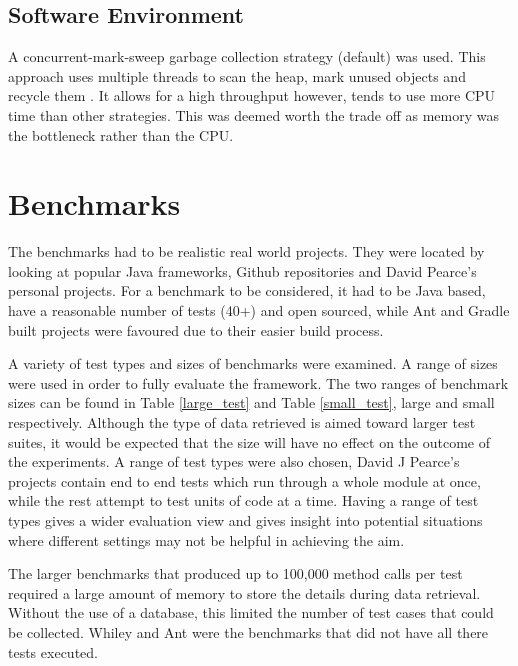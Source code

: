 \subsection{Software Environment}

A concurrent-mark-sweep garbage collection strategy (default) was used. This approach uses multiple threads to scan the heap, mark unused objects and recycle them \cite{oracle2015}. It allows for a high throughput however, tends to use more CPU time than other strategies. This was deemed worth the trade off as memory was the bottleneck rather than the CPU.

\section{Benchmarks}
\label{S:bench}
The benchmarks had to be realistic real world projects. They were located by looking at popular Java frameworks, Github repositories and David Pearce's personal projects. For a benchmark to be considered, it had to be Java based, have a reasonable number of tests (40+) and open sourced, while Ant and Gradle built projects were favoured due to their easier build process.

A variety of test types and sizes of benchmarks were examined. A range of sizes were used in order to fully evaluate the framework. The two ranges of benchmark sizes can be found in Table \ref{large_test} and Table \ref{small_test}, large and small respectively. Although the type of data retrieved is aimed toward larger test suites, it would be expected that the size will have no effect on the outcome of the experiments. A range of test types were also chosen, David J Pearce's projects contain end to end tests which run through a whole module at once, while the rest attempt to test units of code at a time. Having a range of test types gives a wider evaluation view and gives insight into potential situations where different settings may not be helpful in achieving the aim.

The larger benchmarks that produced up to 100,000 method calls per test required a large amount of memory to store the details during data retrieval. Without the use of a database, this limited the number of test cases that could be collected. Whiley and Ant were the benchmarks that did not have all there tests executed.  

